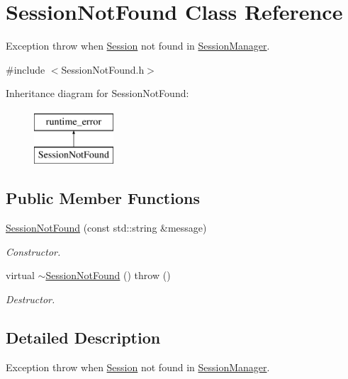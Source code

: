 \hypertarget{class_session_not_found}{\section{Session\-Not\-Found Class Reference}
\label{class_session_not_found}
}


Exception throw when \hyperlink{class_session}{Session} not found in \hyperlink{class_session_manager}{Session\-Manager}.  




{\ttfamily \#include $<$Session\-Not\-Found.\-h$>$}

Inheritance diagram for Session\-Not\-Found\-:\begin{figure}[H]
\begin{center}
\leavevmode
\includegraphics[height=2.000000cm]{class_session_not_found}
\end{center}
\end{figure}
\subsection*{Public Member Functions}
\begin{DoxyCompactItemize}
\item 
\hyperlink{class_session_not_found_aad337d8c885f041382935c2c3408c41f}{Session\-Not\-Found} (const std\-::string \&message)
\begin{DoxyCompactList}\small\item\em Constructor. \end{DoxyCompactList}\item 
\hypertarget{class_session_not_found_ab001651a30e1c22a40bab6db1068b54c}{virtual \hyperlink{class_session_not_found_ab001651a30e1c22a40bab6db1068b54c}{$\sim$\-Session\-Not\-Found} ()  throw ()}\label{class_session_not_found_ab001651a30e1c22a40bab6db1068b54c}

\begin{DoxyCompactList}\small\item\em Destructor. \end{DoxyCompactList}\end{DoxyCompactItemize}


\subsection{Detailed Description}
Exception throw when \hyperlink{class_session}{Session} not found in \hyperlink{class_session_manager}{Session\-Manager}. 

